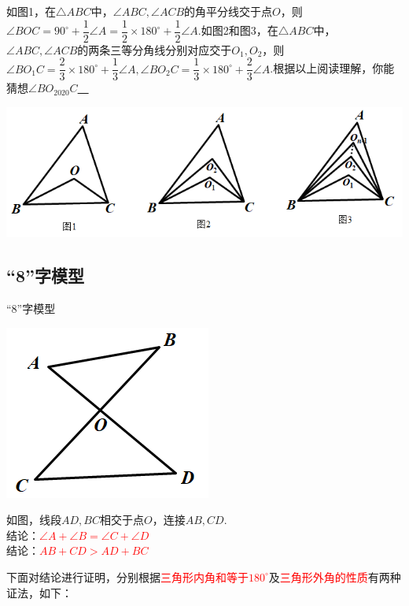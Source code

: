 \documentclass[10pt,twocolumn]{ctexart}
\begin{document}
\begin{example}
如图1，在$\triangle ABC$中，$\angle ABC,\angle ACB$的角平分线交于点$O$，则$\angle BOC=90^\circ+\dfrac{1}{2}\angle A=\dfrac{1}{2}\times 180^\circ+\dfrac{1}{2}\angle A$.如图2和图3，在$\triangle ABC$中，$\angle ABC,\angle ACB$的两条三等分角线分别对应交于$O_1,O_2$，则$\angle BO_1C=\dfrac{2}{3}\times 180^\circ+\dfrac{1}{3}\angle A,\angle BO_2C=\dfrac{1}{3}\times 180^\circ+\dfrac{2}{3}\angle A$.根据以上阅读理解，你能猜想$\angle BO_{2020}C$\underline{~\hspace{1cm}~}
\end{example}

 \includegraphics[scale=0.6]{figure/feibiao08.PNG}


\subsection{“8”字模型}

\begin{custom}[explorecolor]{“8”字模型}
\begin{minipage}{0.3\textwidth}
 \includegraphics[scale=0.3]{figure/bazhi01.PNG}
\end{minipage}
\begin{minipage}{0.6\textwidth}
如图，线段$AD,BC$相交于点$O$，连接$AB,CD$.\\
结论：\textcolor{red}{$\angle A+\angle B=\angle C+\angle D$}\\
结论：\textcolor{red}{$AB+CD>AD+BC$}
\end{minipage}
\end{custom}
下面对结论进行证明，分别根据\textcolor{red}{三角形内角和等于$180^\circ$}及\textcolor{red}{三角形外角的性质}有两种证法，如下：
\end{document}
